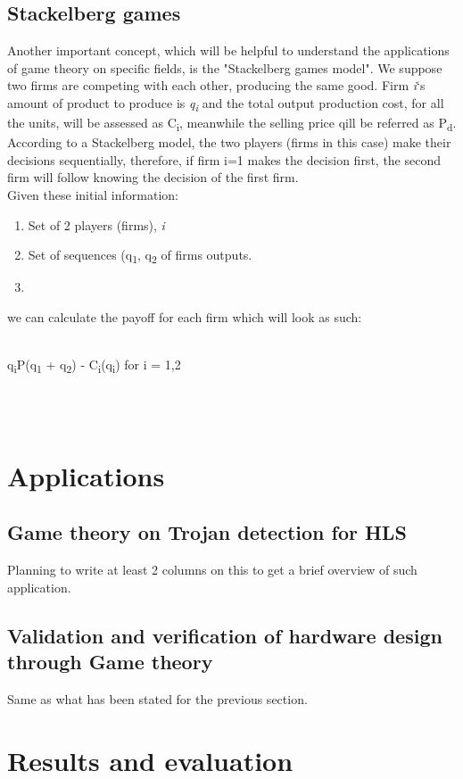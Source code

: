 \documentclass[conference]{IEEEtran}
\begin{document}
\subsection{Stackelberg games}
Another important concept, which will be helpful to understand the applications of game theory on specific fields, is the "Stackelberg games model".
We suppose two firms are competing with each other, producing the same good. Firm \textit{i}`s amount of product to produce is \textit{q\textsubscript{i}} and the total output production cost, for all the units, will be assessed as C\textsubscript{i}, meanwhile the selling price qill be referred as P\textsubscript{d}. According to a Stackelberg model, the two players (firms in this case) make their decisions sequentially, therefore, if firm i=1 makes the decision first, the second firm will follow knowing the decision of the first firm.\\
Given these initial information:
\begin{enumerate}
\item Set of 2 players (firms), \textit{i}
\item Set of sequences (q\textsubscript{1}, q\textsubscript{2} of firms outputs.
\item 
\end{enumerate}

 we can calculate the payoff for each firm which will look as such:\\\\
\centerline{q\textsubscript{i}P(q\textsubscript{1} + q\textsubscript{2}) - C\textsubscript{i}(q\textsubscript{i}) for i = 1,2}\\\\

\section{Applications}
\subsection{Game theory on Trojan detection for HLS}
Planning to write at least 2 columns on this to get a brief overview of such application.
\subsection{Validation and verification of hardware design through Game theory}
Same as what has been stated for the previous section.

\section{Results and evaluation}
\end{document}

